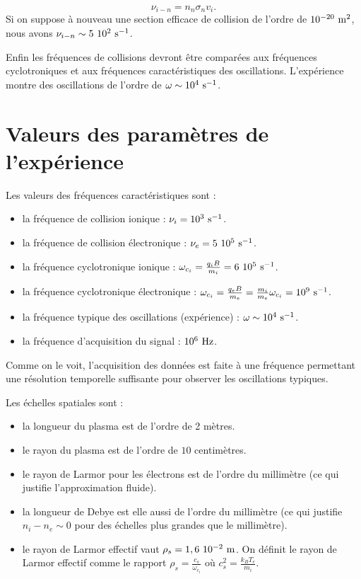 \documentclass{book}
\begin{document}
\begin{equation}
\nu_{i- n}=n_n\sigma_n v_i.
\end{equation}
Si on suppose \`a nouveau une section efficace de collision de l'ordre
de  $10^{-20}\ {\rm m}^2$, nous avons
$\nu_{i- n}\sim 5\ 10^2\ {\rm s}^{-1}$.

Enfin les fr\'equences de collisions devront \^etre compar\'ees aux
fr\'equences cyclotroniques et aux fr\'equences caract\'eristiques des
oscillations. L'exp\'erience montre des oscillations de l'ordre de 
$\omega\sim 10^{4}\ {\rm s}^{-1}$.


\section{Valeurs des param\`etres de
l'exp\'erience}

Les valeurs des fr\'equences caract\'eristiques sont :
\begin{itemize}
\item la fr\'equence de collision ionique : $\nu_i=10^{3}\ {\rm s}^{-1}$.
\item la fr\'equence de collision \'electronique : $\nu_e=5\ 10^{5}\
{\rm s}^{-1}$. 
\item la fr\'equence cyclotronique ionique : 
$\omega_{c_i}=\frac{q_iB}{m_i}=6\ 10^{5}\ {\rm s}^{-1}$.
\item la fr\'equence cyclotronique \'electronique :
$\omega_{c_i}=\frac{q_e B}{m_e}=\frac{m_i}{m_e}\omega_{c_i}=10^{9}\ {\rm
s}^{-1}$.
\item la fr\'equence typique des oscillations (exp\'erience) :
$\omega\sim 
10^{4}\ {\rm s}^{-1}$. 
\item la fr\'equence d'acquisition du signal : $10^{6}\ {\rm Hz}$.
\end{itemize}
Comme on le voit, l'acquisition des donn\'ees est faite \`a une
fr\'equence permettant une r\'esolution temporelle suffisante pour
observer les oscillations typiques.

Les \'echelles spatiales sont :
\begin{itemize}
\item la longueur du plasma est de l'ordre de 2 m\`etres. 
\item le rayon du plasma est de l'ordre de $10$ centim\`etres.
\item le rayon de Larmor pour les \'electrons est de l'ordre du
millim\`etre (ce qui justifie l'approximation fluide).
\item la longueur de Debye est elle aussi de l'ordre du millim\`etre
(ce qui justifie $n_i-n_e\sim 0$ pour des \'echelles plus grandes que
le millim\`etre). 
\item le rayon de Larmor effectif  vaut $\rho_s=1,6\ 10^{-2}\ {\rm m}$.
On d\'efinit le rayon de Larmor effectif comme le rapport
$\rho_s=\frac{c_s}{\omega_{c_i}}$
o\`u $c_s^2=\frac{k_B T_e}{m_i}$.
\end{itemize}
\end{document}
